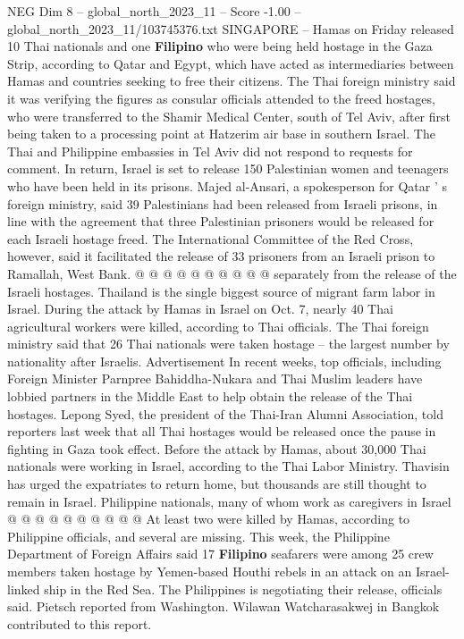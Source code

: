 \begin{textsample}{NEG Dim 8 – global\_north\_2023\_11 – Score -1.00 – global\_north\_2023\_11/103745376.txt}  \label{ex:f8_neg_263}
SINGAPORE -- Hamas on Friday released 10 Thai nationals and one \textbf{Filipino} who were being held hostage in the Gaza Strip, according to Qatar and Egypt, which have acted as intermediaries between Hamas and countries seeking to free their citizens.
The Thai foreign ministry said it was verifying the figures as consular officials attended to the freed hostages, who were transferred to the Shamir Medical Center, south of Tel Aviv, after first being taken to a processing point at Hatzerim air base in southern Israel.
The Thai and Philippine embassies in Tel Aviv did not respond to requests for comment.
In return, Israel is set to release 150 Palestinian women and teenagers who have been held in its prisons.
Majed al-Ansari, a spokesperson for Qatar ' s foreign ministry, said 39 Palestinians had been released from Israeli prisons, in line with the agreement that three Palestinian prisoners would be released for each Israeli hostage freed.
The International Committee of the Red Cross, however, said it facilitated the release of 33 prisoners from an Israeli prison to Ramallah, West Bank. @ @ @ @ @ @ @ @ @ @ separately from the release of the Israeli hostages.
Thailand is the single biggest source of migrant farm labor in Israel.
During the attack by Hamas in Israel on Oct. 7, nearly 40 Thai agricultural workers were killed, according to Thai officials.
The Thai foreign ministry said that 26 Thai nationals were taken hostage -- the largest number by nationality after Israelis.
Advertisement In recent weeks, top officials, including Foreign Minister Parnpree Bahiddha-Nukara and Thai Muslim leaders have lobbied partners in the Middle East to help obtain the release of the Thai hostages.
Lepong Syed, the president of the Thai-Iran Alumni Association, told reporters last week that all Thai hostages would be released once the pause in fighting in Gaza took effect.
Before the attack by Hamas, about 30,000 Thai nationals were working in Israel, according to the Thai Labor Ministry.
Thavisin has urged the expatriates to return home, but thousands are still thought to remain in Israel.
Philippine nationals, many of whom work as caregivers in Israel @ @ @ @ @ @ @ @ @ @ At least two were killed by Hamas, according to Philippine officials, and several are missing.
This week, the Philippine Department of Foreign Affairs said 17 \textbf{Filipino} seafarers were among 25 crew members taken hostage by Yemen-based Houthi rebels in an attack on an Israel-linked ship in the Red Sea.
The Philippines is negotiating their release, officials said.
Pietsch reported from Washington.
Wilawan Watcharasakwej in Bangkok contributed to this report.

\end{textsample}
